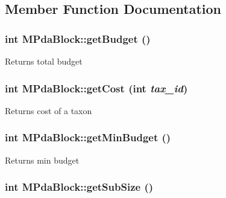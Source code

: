 \subsection{Member Function Documentation}
\hypertarget{classMPdaBlock_a670ae262a9f283604cdb289a54f3abd5}{
\subsubsection[{getBudget}]{\setlength{\rightskip}{0pt plus 5cm}int MPdaBlock::getBudget ()}}
\label{classMPdaBlock_a670ae262a9f283604cdb289a54f3abd5}
\begin{DoxyReturn}{Returns}
total budget 
\end{DoxyReturn}
\hypertarget{classMPdaBlock_a1055777b11e0944b8ca18935f3af6f2e}{
\subsubsection[{getCost}]{\setlength{\rightskip}{0pt plus 5cm}int MPdaBlock::getCost (int {\em tax\_\-id})}}
\label{classMPdaBlock_a1055777b11e0944b8ca18935f3af6f2e}
\begin{DoxyReturn}{Returns}
cost of a taxon 
\end{DoxyReturn}
\hypertarget{classMPdaBlock_a6a41191883550a8b986a2a6e43617ca5}{
\subsubsection[{getMinBudget}]{\setlength{\rightskip}{0pt plus 5cm}int MPdaBlock::getMinBudget ()}}
\label{classMPdaBlock_a6a41191883550a8b986a2a6e43617ca5}
\begin{DoxyReturn}{Returns}
min budget 
\end{DoxyReturn}
\hypertarget{classMPdaBlock_a551b1f35390ddf325216d2a70f8adb3f}{
\subsubsection[{getSubSize}]{\setlength{\rightskip}{0pt plus 5cm}int MPdaBlock::getSubSize ()}}
